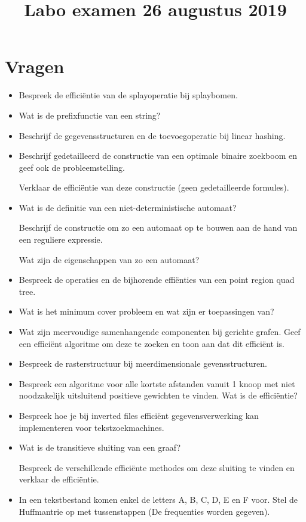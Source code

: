 \documentclass{article}
\title{Labo examen 26 augustus 2019}
\author{}
\begin{document}
    \maketitle 


    \section*{Vragen}

    \begin{itemize}
        \item Bespreek de efficiëntie van de splayoperatie bij splaybomen.
        \item Wat is de prefixfunctie van een string?
        \item Beschrijf de gegevensstructuren en de toevoegoperatie bij linear hashing.
        \item Beschrijf gedetailleerd de constructie van een optimale binaire zoekboom en geef ook de probleemstelling.

        Verklaar de efficiëntie van deze constructie (geen gedetailleerde formules).
        \item Wat is de definitie van een niet-deterministische automaat?
        
        Beschrijf de constructie om zo een automaat op te bouwen aan de hand van een reguliere expressie.
    
        Wat zijn de eigenschappen van zo een automaat?

        \item Bespreek de operaties en de bijhorende effiënties van een point region quad tree.
        \item Wat is het minimum cover probleem en wat zijn er toepassingen van?
        \item Wat zijn meervoudige samenhangende componenten bij gerichte grafen. Geef een efficiënt algoritme om deze te zoeken en toon aan dat dit efficiënt is.
        \item Bespreek de rasterstructuur bij meerdimensionale gevensstructuren.
        \item Bespreek een algoritme voor alle kortste afstanden vanuit 1 knoop met niet noodzakelijk uitsluitend positieve gewichten te vinden. Wat is de efficiëntie?
        \item Bespreek hoe je bij inverted files efficiënt gegevensverwerking kan implementeren voor tekstzoekmachines.
        \item Wat is de transitieve sluiting van een graaf?

        Bespreek de verschillende efficiënte methodes om deze sluiting te vinden en verklaar de efficiëntie.
        \item In een tekstbestand komen enkel de letters A, B, C, D, E en F voor. Stel de Huffmantrie op met tussenstappen (De frequenties worden gegeven).

    \end{itemize}
\end{document}
